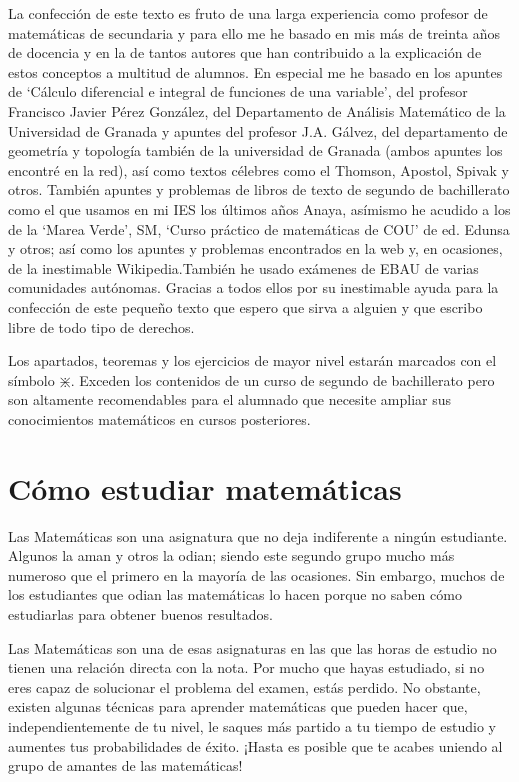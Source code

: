 La confección de este texto es fruto de una larga experiencia como profesor de matemáticas de secundaria y para ello me he basado en mis más de treinta años de docencia  y en la de tantos autores que han contribuido a la explicación de estos conceptos a multitud de alumnos. En especial me he basado en los apuntes de `Cálculo diferencial e integral de funciones de una variable', del profesor Francisco Javier Pérez González, del Departamento de Análisis Matemático de la Universidad de Granada y apuntes del profesor J.A. Gálvez, del departamento de geometría y topología también de la universidad de Granada (ambos apuntes los encontré en la red), así como textos célebres como el Thomson, Apostol, Spivak y otros. También apuntes y problemas de libros de texto de segundo de bachillerato como el que usamos en mi IES los últimos años Anaya, asímismo he acudido a  los de la `Marea Verde', SM, `Curso práctico de matemáticas de COU' de ed. Edunsa y otros;  así como los apuntes y problemas encontrados en la web y, en ocasiones, de la inestimable Wikipedia.También he usado exámenes de EBAU de varias comunidades autónomas. Gracias a todos ellos por su inestimable ayuda para la confección de este pequeño texto que espero que sirva a alguien y que escribo libre de todo tipo de derechos.

Los apartados, teoremas y los ejercicios de mayor nivel estarán marcados con el símbolo $\divideontimes$. Exceden los contenidos de un curso de segundo de bachillerato pero son altamente recomendables para el alumnado que necesite ampliar sus conocimientos matemáticos en cursos posteriores.

\section{Cómo estudiar matemáticas}

 
Las Matemáticas son una asignatura que no deja indiferente a ningún estudiante. Algunos la aman y otros la odian; siendo este segundo grupo mucho más numeroso que el primero en la mayoría de las ocasiones. Sin embargo, muchos de los estudiantes que odian las matemáticas lo hacen porque no saben cómo estudiarlas para obtener buenos resultados.

Las Matemáticas son una de esas asignaturas en las que las horas de estudio no tienen una relación directa con la nota. Por mucho que hayas estudiado, si no eres capaz de solucionar el problema del examen, estás perdido. No obstante, existen algunas técnicas para aprender matemáticas que pueden hacer que, independientemente de tu nivel, le saques más partido a tu tiempo de estudio y aumentes tus probabilidades de éxito. ¡Hasta es posible que te acabes uniendo al grupo de amantes de las matemáticas!

